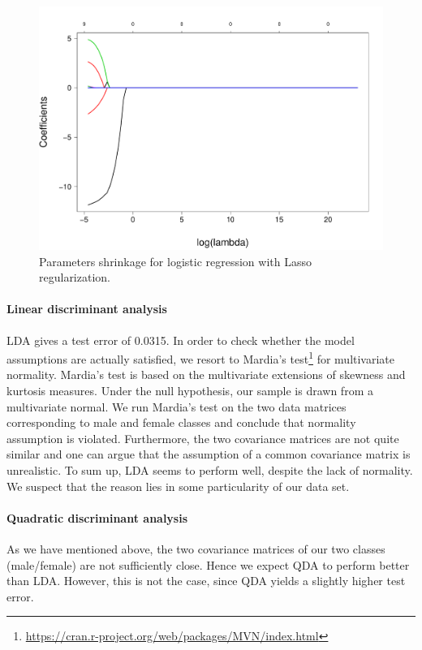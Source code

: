 \begin{figure}[htb]
	\centering
	\includegraphics[height=\BoxPlotFigHeight]{figures/lasso.pdf}\hfill%
\caption{Parameters shrinkage for logistic regression with Lasso regularization.}
\label{fig_lasso_logreg}
\end{figure}
\paragraph{Linear discriminant analysis}
LDA gives a test error of \num{0.0315}. In order to check whether the model assumptions are actually satisfied, we resort to Mardia's test\footnote{\url{https://cran.r-project.org/web/packages/MVN/index.html}} for multivariate normality. Mardia's test is based on the multivariate extensions of skewness and kurtosis measures. Under the null hypothesis, our sample is drawn from a multivariate normal. 
We run Mardia's test on the two data matrices corresponding to male and female classes and conclude that normality assumption is violated. Furthermore, the two covariance matrices are not quite similar and one can argue that the assumption of a common covariance matrix is unrealistic.
To sum up, LDA seems to perform well, despite the lack of normality. We suspect that the reason lies in some particularity of our data set.
\paragraph{Quadratic discriminant analysis}
As we have mentioned above, the two covariance matrices of our two classes (male/female) are not sufficiently close. Hence we expect QDA to perform better than LDA. However, this is not the case, since QDA yields a slightly higher test error.

